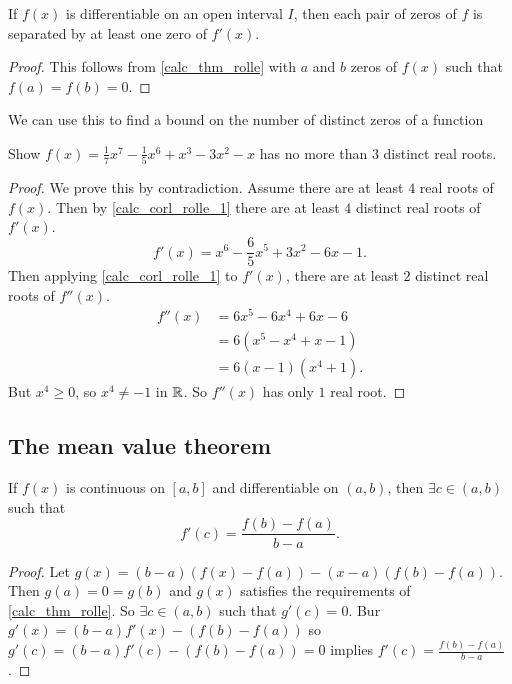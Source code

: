 \documentclass[10pt, a4paper]{article}
\begin{document}
\begin{corollary}\label{calc_corl_rolle_1}
    If $f(x)$ is differentiable on an open interval $I$,
    then each pair of zeros of $f$ is separated by at least one zero of $f'(x)$.
    \begin{proof}
        This follows from \autoref{calc_thm_rolle} with $a$ and $b$ zeros of $f(x)$ such that $f(a) = f(b) = 0$.
    \end{proof}
\end{corollary}
We can use this to find a bound on the number of distinct zeros of a function
\begin{example}
    Show $f(x) = \frac{1}{7}x ^ 7 - \frac{1}{5}x ^ 6 + x ^ 3 - 3x ^ 2 - x$ has no more than $3$ distinct real roots.
    \begin{proof}
        We prove this by contradiction.
        Assume there are at least $4$ real roots of $f(x)$.
        Then by \autoref{calc_corl_rolle_1} there are at least $4$ distinct real roots of $f'(x)$.
        \[
        f'(x) = x ^ 6 - \frac{6}{5}x ^ 5 + 3x ^ 2 - 6x - 1.
        \]
        Then applying \autoref{calc_corl_rolle_1} to $f'(x)$,
        there are at least $2$ distinct real roots of $f''(x)$.
        \begin{align*}
            f''(x) &= 6x ^ 5 - 6x ^ 4 + 6x - 6 \\
            &= 6(x ^ 5 - x ^ 4 + x - 1) \\
            &= 6(x - 1)(x ^ 4 + 1).
        \end{align*}
        But $x ^ 4 \geq 0$, so $x ^ 4 \neq -1$ in $\mathbb{R}$.
        So $f''(x)$ has only $1$ real root.
    \end{proof}
\end{example}

\subsection{The mean value theorem}

\begin{theorem}\label{calc_thm_meanval}
    If $f(x)$ is continuous on $[a, b]$ and differentiable on $(a, b)$,
    then $\exists c \in (a, b)$ such that
    \[
    f'(c) = \frac{f(b) - f(a)}{b - a}.
    \]
    \begin{proof}
        Let $g(x) = (b - a)(f(x) - f(a)) - (x - a)(f(b) - f(a))$.
        Then $g(a) = 0 = g(b)$ and $g(x)$ satisfies the requirements of \autoref{calc_thm_rolle}.
        So $\exists c \in (a, b)$ such that $g'(c) = 0$.
        Bur $g'(x) = (b - a)f'(x) - (f(b) - f(a))$ so $g'(c) = (b - a)f'(c) - (f(b) - f(a)) = 0$
        implies $f'(c) = \frac{f(b) - f(a)}{b - a}$.
    \end{proof}
\end{theorem}
\end{document}
